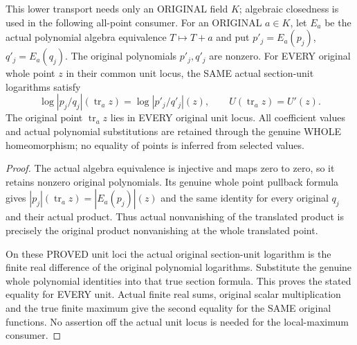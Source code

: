 \begin{theorem}
\label{analytic:actual-original-unit-max-whole-translation}
\leanok
{}
This lower transport needs only an ORIGINAL field $K$; algebraic closedness
is used in the following all-point consumer. For an ORIGINAL $a\in K$, let $E_a$ be the actual polynomial algebra
equivalence $T\mapsto T+a$ and put $p'_j=E_a(p_j)$, $q'_j=E_a(q_j)$.
The original polynomials $p'_j,q'_j$ are nonzero. For EVERY original whole
point $z$ in their common unit locus, the SAME actual section-unit
logarithms satisfy
\[
 \log|p_j/q_j|(\operatorname{tr}_a z)
          =\log|p'_j/q'_j|(z),
 \qquad U(\operatorname{tr}_a z)=U'(z).
\]
The original point $\operatorname{tr}_a z$ lies in EVERY original unit
locus. All coefficient values and actual polynomial substitutions are
retained through the genuine WHOLE homeomorphism; no equality of points
is inferred from selected values.
\end{theorem}
\begin{proof}
The actual algebra equivalence is injective and maps zero to zero, so it
retains nonzero original polynomials. Its genuine whole point pullback
formula gives $|p_j|(\operatorname{tr}_a z)=|E_a(p_j)|(z)$ and the same
identity for every original $q_j$ and their actual product. Thus actual
nonvanishing of the translated product is precisely the original product
nonvanishing at the whole translated point.

On these PROVED unit loci the actual original section-unit logarithm is
the finite real difference of the original polynomial logarithms. Substitute
the genuine whole polynomial identities into that true section formula.
This proves the stated equality for EVERY unit. Actual finite real sums,
original scalar multiplication and the true finite maximum give the second
equality for the SAME original functions. No assertion off the actual unit
locus is needed for the local-maximum consumer.
\end{proof}

